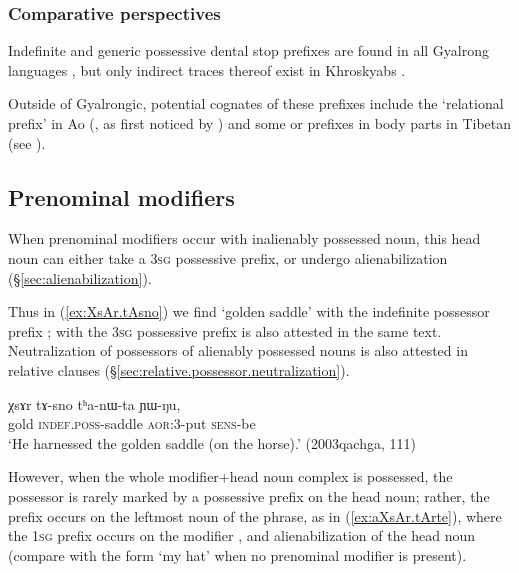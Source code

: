 \subsubsection{Comparative perspectives} \label{sec:indef.t.comparative}
Indefinite and generic possessive dental stop prefixes are found in all Gyalrong languages \citep{jackson98morphology}, but only indirect traces thereof exist in Khroskyabs  \citep[155]{lai17khroskyabs}. 

Outside of Gyalrongic, potential cognates of these prefixes include the `relational prefix'  in Ao (\citealt[84--85]{coupe07mongsen}, as first noticed by \citealt[141--142]{wolfenden29outlines}) and some  or  prefixes in body parts in Tibetan (see \citealt{jacques14snom}).
 
\subsection{Prenominal modifiers} \label{sec:possessive.prefixes.prenominal}
When prenominal modifiers occur with  inalienably possessed noun, this head noun can either take a \textsc{3sg} possessive prefix, or undergo alienabilization  (§\ref{sec:alienabilization}). 

Thus in (\ref{ex:XsAr.tAsno}) we find  `golden saddle' with the indefinite possessor prefix ;  with the \textsc{3sg} possessive prefix is also attested in the same text. Neutralization of possessors of alienably possessed nouns is also attested in relative clauses (§\ref{sec:relative.possessor.neutralization}).

\begin{exe}
\ex \label{ex:XsAr.tAsno}
\gll  χsɤr tɤ-sno tʰa-nɯ-ta ɲɯ-ŋu, \\
gold  \textsc{indef}.\textsc{poss}-saddle \textsc{aor}:3\flobv{}-put \textsc{sens}-be \\
\glt `He harnessed the golden saddle (on the horse).' (2003qachga, 111)
\end{exe}

However, when the whole modifier+head noun complex is possessed, the possessor is rarely marked by a possessive prefix on the head noun; rather, the prefix occurs on the leftmost noun of the phrase, as in (\ref{ex:aXsAr.tArte}), where the \textsc{1sg} prefix  occurs on the modifier , and alienabilization of the head noun  (compare with the form  `my hat' when no prenominal modifier is present). %

